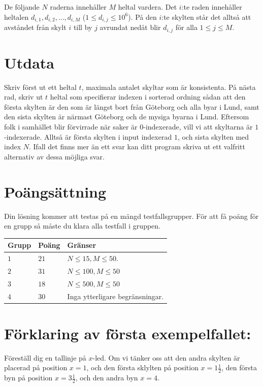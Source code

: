 De följande $N$ raderna innehåller $M$ heltal vardera. Det $i$:te raden innehåller heltalen $d_{i,1}, d_{i,2}, \ldots, d_{i,M}$ ($1 \leq d_{i,j} \leq 10^6$). 
På den $i$:te skylten står det alltså att avståndet från skylt $i$ till by $j$ avrundat nedåt blir $d_{i,j}$ för alla $1 \leq j \leq M$.


\section*{Utdata}
Skriv först ut ett heltal $t$, maximala antalet skyltar som är konsistenta. 
På nästa rad, skriv ut $t$ heltal som specifierar indexen i sorterad ordning sådan att den 
första skylten är den som är längst bort från Göteborg och alla byar i Lund, samt den sista skylten är närmast Göteborg och de mysiga byarna i Lund.
Eftersom folk i samhället blir förvirrade när saker är $0$-indexerade, vill vi att skyltarna är $1$-indexerade. Alltså är första skylten i input indexerad $1$, och sista skylten med index $N$.
Ifall det finns mer än ett svar kan ditt program skriva ut ett valfritt alternativ av dessa möjliga svar.

\section*{Poängsättning}
Din lösning kommer att testas på en mängd testfallsgrupper.
För att få poäng för en grupp så måste du klara alla testfall i gruppen.

\noindent
\begin{tabular}{| l | l | p{12cm} |}
  \hline
  \textbf{Grupp} & \textbf{Poäng} & \textbf{Gränser} \\ \hline
  $1$    & $21$         & $N \leq 15, M \leq 50$.  \\ \hline
  $2$    & $31$         & $N \leq 100, M \leq 50$ \\ \hline
  $3$    & $18$         & $N \leq 500, M \leq 50$ \\ \hline
  $4$    & $30$         & Inga ytterligare begränsningar. \\ \hline
\end{tabular}



\section*{Förklaring av första exempelfallet:}
Föreställ dig en tallinje på $x$-led.
Om vi tänker oss att den andra skylten är placerad på position $x = 1$, och den första sklylten på position $x = 1\frac{1}{2}$, 
den första byn på position $x = 3\frac{1}{2}$, och den andra byn $x = 4$. 

